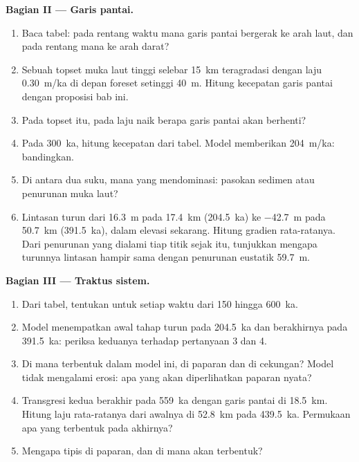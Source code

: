 \begin{problem}
\medskip\noindent\textbf{Bagian II --- Garis pantai.}
\begin{enumerate}[resume]
\item Baca tabel: pada rentang waktu mana garis pantai bergerak ke arah laut,
  dan pada rentang mana ke arah darat?
\item Sebuah topset muka laut tinggi selebar \qty{15}{km} teragradasi dengan laju \qty{0.30}{m/ka}
  di depan foreset setinggi \qty{40}{m}. Hitung kecepatan
  garis pantai dengan proposisi bab ini.
\item Pada topset itu, pada laju naik berapa garis pantai akan berhenti?
\item Pada \qty{300}{ka}, hitung kecepatan  dari
  tabel. Model memberikan \qty{204}{m/ka}: bandingkan.
\item Di antara dua suku, mana yang mendominasi: pasokan sedimen atau penurunan muka laut?
\item Lintasan turun dari \qty{16.3}{m} pada \qty{17.4}{km}
  (\qty{204.5}{ka}) ke \qty{-42.7}{m} pada \qty{50.7}{km}
  (\qty{391.5}{ka}), dalam elevasi sekarang. Hitung gradien rata-ratanya.
  Dari penurunan yang dialami tiap titik sejak itu, tunjukkan mengapa turunnya lintasan
  hampir sama dengan penurunan eustatik \qty{59.7}{m}.
\end{enumerate}

\medskip\noindent\textbf{Bagian III --- Traktus sistem.}
\begin{enumerate}[resume]
\item Dari tabel, tentukan  untuk setiap waktu dari 150 hingga
  \qty{600}{ka}.
\item Model menempatkan awal tahap turun pada \qty{204.5}{ka}
  dan berakhirnya pada \qty{391.5}{ka}: periksa keduanya terhadap pertanyaan 3 dan 4.
\item Di mana  terbentuk dalam model ini, di paparan dan
  di cekungan? Model tidak mengalami erosi: apa yang akan diperlihatkan paparan nyata?
\item Transgresi kedua berakhir pada \qty{559}{ka} dengan garis pantai di
  \qty{18.5}{km}. Hitung laju rata-ratanya dari awalnya di \qty{52.8}{km} pada
  \qty{439.5}{ka}. Permukaan apa yang terbentuk pada akhirnya?
\item Mengapa  tipis di paparan, dan di mana
   akan terbentuk?
\end{enumerate}


\end{problem}
